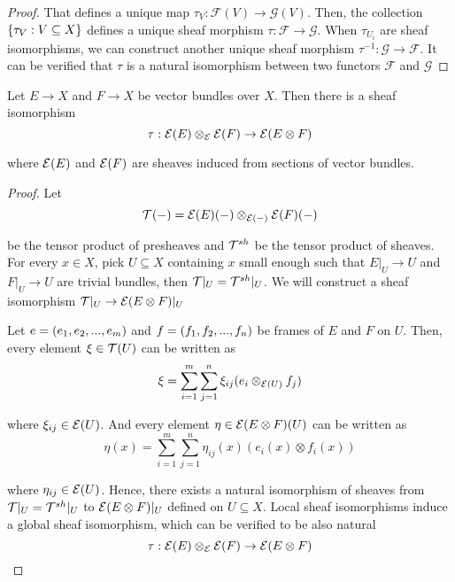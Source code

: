 \begin{lemma}
\begin{proof}
		That defines a unique map $\tau_V: \mathcal{F}(V) \to \mathcal{G}(V)$. Then, the collection $\{\tau_V: V \subseteq X\}$ defines a unique sheaf morphism $\tau: \mathcal{F} \to \mathcal{G}$. When $\tau_{U_i}$ are sheaf isomorphisms, we can construct another unique sheaf morphism $\tau^{-1}: \mathcal{G} \to \mathcal{F}$. It can be verified that $\tau$ is a natural isomorphism between two functors $\mathcal{F}$ and $\mathcal{G}$
	\end{proof}
\end{lemma}


\begin{proposition}
	Let $E \to X$ and $F \to X$ be vector bundles over $X$. Then there is a sheaf isomorphism
	$$
	\tau: \mathcal{E}(E) \otimes_{\mathcal{E}} \mathcal{E}(F) \to \mathcal{E}(E \otimes F)
	$$
	
	where $\mathcal{E}(E)$ and $\mathcal{E}(F)$ are sheaves induced from sections of vector bundles.
	\begin{proof}
		Let 
		$$
			\mathcal{T}(-) = \mathcal{E}(E)(-) \otimes_{\mathcal{E}(-)} \mathcal{E}(F)(-)
		$$
		
		be the tensor product of presheaves and $\mathcal{T}^{sh}$ be the tensor product of sheaves. For every $x \in X$, pick $U \subseteq X$ containing $x$ small enough such that $E\vert_U \to U$ and $F\vert_U \to U$ are trivial bundles, then $\mathcal{T}\vert_U = \mathcal{T}^{sh}\vert_U$. We will construct a sheaf isomorphism $\mathcal{T}\vert_U \to \mathcal{E}(E \otimes F)\vert_U$
		\begin{center}
		\end{center}
		
		Let $e = (e_1, e_2, ..., e_m)$ and $f = (f_1, f_2, ..., f_n)$ be frames of $E$ and $F$ on $U$. Then, every element $\xi \in \mathcal{T}(U)$ can be written as
		$$
			\xi = \sum_{i=1}^m \sum_{j=1}^n \xi_{ij} (e_i \otimes_{\mathcal{E}(U)} f_j)
		$$
		
		where $\xi_{ij} \in \mathcal{E}(U)$. And every element $\eta \in \mathcal{E}(E \otimes F)(U)$ can be written as
		$$
			\eta(x) = \sum_{i=1}^m \sum_{j=1}^n \eta_{ij}(x) (e_i(x) \otimes f_i(x))
		$$
		
		where $\eta_{ij} \in \mathcal{E}(U)$. Hence, there exists a natural isomorphism of sheaves from $\mathcal{T}\vert_U = \mathcal{T}^{sh}\vert_U$ to $\mathcal{E}(E \otimes F)\vert_U$ defined on $U \subseteq X$. Local sheaf isomorphisms induce a global sheaf isomorphism, which can be verified to be also natural
		$$
			\tau: \mathcal{E}(E) \otimes_{\mathcal{E}} \mathcal{E}(F) \to \mathcal{E}(E \otimes F)
		$$ 
	\end{proof}
\end{proposition}
